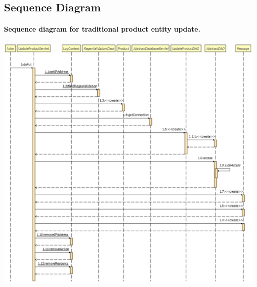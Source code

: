\pagebreak
\subsection{Sequence Diagram}
\paragraph[]{Sequence diagram for traditional product entity update.} \hspace{1mm} \par
\includegraphics[width=\textwidth, keepaspectratio]{resources/updateproductsequence.pdf}
\pagebreak
